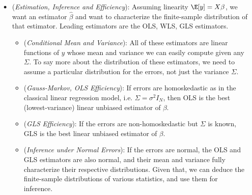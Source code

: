 \documentclass[12pt]{article}
\theoremstyle{plain}
\theoremstyle{definition}
\theoremstyle{remark}
\begin{document}
\begin{itemize}
  \item
    (\emph{Estimation, Inference and Efficiency}):
    Assuming linearity $\E[y]=X\beta$,
    we want an estimator $\hat{\beta}$ and want to characterize the
    finite-sample distribution of that estimator.
    Leading estimators are the OLS, WLS, GLS estimators.
    \begin{itemize}
      \item (\emph{Conditional Mean and Variance}):
        All of these estimators are linear functions of $y$ whose mean
        and variance we can easily compute given any $\Sigma$.
        To say more about the distribution of these estimators, we need
        to assume a particular distribution for the errors, not just the
        variance $\Sigma$.

      \item
        (\emph{Gauss-Markov, OLS Efficiency}):
        If errors are homoskedastic as in the classical linear regression
        model, i.e. $\Sigma=\sigma^2 I_N$, then OLS is the best
        (lowest-variance) linear unbiased estimator of ${\beta}$.

      \item
        (\emph{GLS Efficiency}):
        If the errors are non-homoskedastic but $\Sigma$ is known, GLS
        is the best linear unbiased estimator of $\beta$.

      \item
        (\emph{Inference under Normal Errors}):
        If the errors are normal, the OLS and GLS estimators are also
        normal, and their mean and variance fully characterize their
        respective distributions.
        Given that, we can deduce the finite-sample distributions of various
        statistics, and use them for inference.
    \end{itemize}

\end{itemize}




\clearpage
\end{document}
